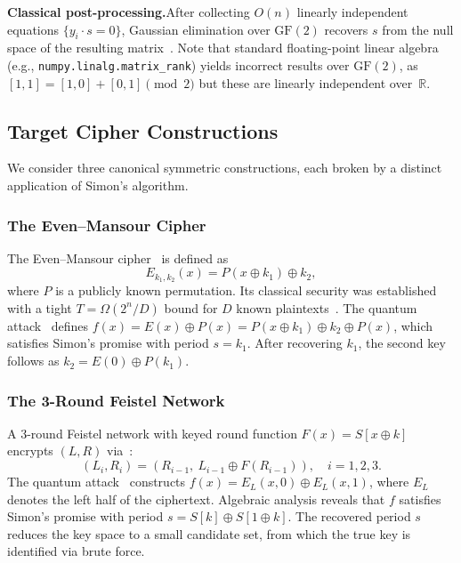 \documentclass[11pt,a4paper]{article}
\begin{document}
\textbf{Classical post-processing.}\quad After collecting $O(n)$
linearly independent equations $\{y_i \cdot s = 0\}$, Gaussian
elimination over $\text{GF}(2)$ recovers $s$ from the null space of the
resulting matrix~\cite{Simon1997}.  Note that standard floating-point
linear algebra (e.g., \texttt{numpy.linalg.matrix\_rank}) yields
incorrect results over $\text{GF}(2)$, as $[1,1]=[1,0]+[0,1]\pmod{2}$
but these are linearly independent over~$\mathbb{R}$.

\subsection{Target Cipher Constructions}

We consider three canonical symmetric constructions, each broken by a
distinct application of Simon's algorithm.

\subsubsection{The Even--Mansour Cipher}

The Even--Mansour cipher~\cite{EvenMansour1997} is defined as
\begin{equation}\label{eq:em}
    E_{k_1,k_2}(x) = P(x \oplus k_1) \oplus k_2,
\end{equation}
where $P$ is a publicly known permutation.  Its classical security was
established with a tight $T = \Omega(2^n/D)$ bound for $D$ known
plaintexts~\cite{Dunkelman2012}.  The quantum attack~\cite{Kuwakado2012}
defines $f(x) = E(x) \oplus P(x) = P(x \oplus k_1) \oplus k_2 \oplus
P(x)$, which satisfies Simon's promise with period $s = k_1$.
After recovering $k_1$, the second key follows as $k_2 = E(0) \oplus
P(k_1)$.

\subsubsection{The 3-Round Feistel Network}

A 3-round Feistel network with keyed round function $F(x) = S[x \oplus
k]$ encrypts $(L,R)$ via~\cite{LubyRackoff1988}:
\begin{equation}\label{eq:feistel}
    (L_i, R_i) = (R_{i-1},\ L_{i-1} \oplus F(R_{i-1})), \quad
    i=1,2,3.
\end{equation}
The quantum attack~\cite{Kuwakado2010, Kaplan2016} constructs
$f(x) = E_L(x,0) \oplus E_L(x,1)$, where $E_L$ denotes the left half
of the ciphertext.  Algebraic analysis reveals that $f$ satisfies
Simon's promise with period $s = S[k] \oplus S[1 \oplus k]$.
The recovered period $s$ reduces the key space to a small candidate set,
from which the true key is identified via brute force.
\end{document}
